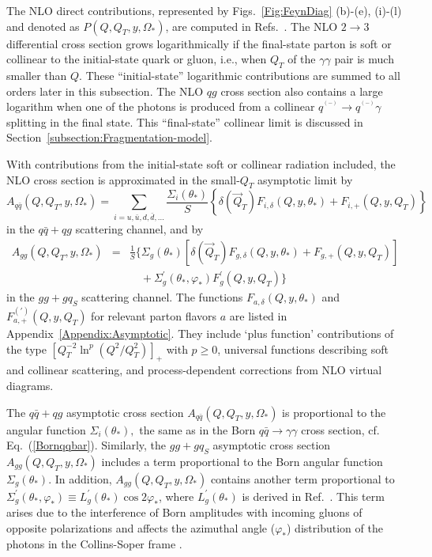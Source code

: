 \documentclass[12pt,english,aps,preprint,prd,letterpaper,fleqn,nofootinbib,showpacs,showkeys,tightenlines,floatfix]{revtex4}
\begin{document}
The NLO direct contributions, represented by Figs.~\ref{Fig:FeynDiag} (b)-(e),
(i)-(l) and denoted as $P(Q,Q_{T},y,\Omega_{*})$, are computed
in Refs.~\cite{Aurenche:1985yk,Bailey:1992br,Balazs:1999yf,deFlorian:1999tp,Bern:2001df,Nadolsky:2007ba,Bern:2002jx}.
The NLO $2\rightarrow3$ differential cross section grows logarithmically
if the final-state parton is soft or collinear to the initial-state
quark or gluon, i.e., when $Q_{T}$ of the $\gamma\gamma$ pair is
much smaller than $Q$. These {}``initial-state'' logarithmic contributions
are summed to all orders later in this subsection. The NLO $qg$ cross section
also contains a large logarithm when one of the photons is produced
from a collinear $q\!\!\!\!^{^{(-)}}\rightarrow q\!\!\!\!^{^{(-)}}\gamma$
splitting in the final state. This {}``final-state'' collinear limit
is discussed in Section~\ref{subsection:Fragmentation-model}.

With contributions from the initial-state soft or collinear radiation
included, the NLO cross section is approximated in the small-$Q_{T}$
asymptotic limit by\begin{equation}
A_{q\bar{q}}(Q,Q_{T},y,\Omega_{*})=\sum_{i=u,\bar{u},d,\bar{d},...}\frac{\Sigma_{i}(\theta_{*})}{S}\left\{ \delta(\vec{Q}_{T})F_{i,\delta}(Q,y,\theta_{*})+F_{i,+}(Q,y,Q_{T})\right\} \label{ASYqqbar}\end{equation}
 in the $q\bar{q}+qg$ scattering channel, and by\begin{eqnarray}
A_{gg}(Q,Q_{T},y,\Omega_{*}) & = & \frac{1}{S}\Biggl\{\Sigma_{g}(\theta_{*})\left[\delta(\vec{Q}_{T})F_{g,\delta}(Q,y,\theta_{*})+F_{g,+}(Q,y,Q_{T})\right]\nonumber \\
 &  & \hspace{12pt}+\Sigma_{g}^{\prime}(\theta_{*},\varphi_{*})F_{g}^{\prime}(Q,y,Q_{T})\Biggr\}\label{ASYgg}\end{eqnarray}
 in the $gg+gq_{S}$ scattering channel. The functions $F_{a,\delta}(Q,y,\theta_{*})$
and $F_{a,+}^{(\prime)}(Q,y,Q_{T})$ for relevant parton flavors $a$
are listed in Appendix~\ref{Appendix:Asymptotic}. They include `plus
function' contributions of the type $\left[Q_{T}^{-2}\ln^{p}\left(Q^{2}/Q_{T}^{2}\right)\right]_{+}$ with
$p\geq0$, universal functions describing soft and collinear scattering,
and process-dependent corrections from NLO virtual diagrams.

The $q\bar{q}+qg$ asymptotic cross section $A_{q\bar{q}}(Q,Q_{T},y,\Omega_{*})$
is proportional to the angular function $\Sigma_{i}(\theta_{*}),$
the same as in the Born $q\bar{q}\rightarrow\gamma\gamma$ cross section,
cf. Eq.~(\ref{Bornqqbar}). Similarly, the $gg+gq_{S}$ asymptotic cross 
section $A_{gg}(Q,Q_{T},y,\Omega_{*})$
includes a term proportional to the Born angular function $\Sigma_{g}(\theta_{*}).$
In addition, $A_{gg}(Q,Q_{T},y,\Omega_{*})$ contains another
term proportional to $\Sigma_{g}^{\prime}(\theta_{*},\varphi_{*})\equiv L_{g}^{\prime}(\theta_{*})\cos2\varphi_{*}$,
where $L_{g}^{\prime}(\theta_{*})$ is derived in Ref.~\cite{Nadolsky:2007ba}.
This term arises due to the interference of Born amplitudes with incoming
gluons of opposite polarizations and affects the azimuthal angle ($\varphi_{*}$)
distribution of the photons in the Collins-Soper frame \cite{Nadolsky:2007ba}.
\end{document}
